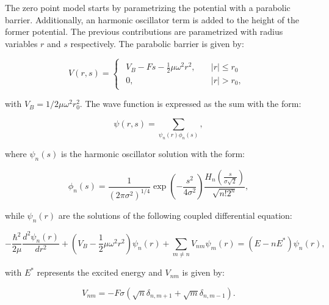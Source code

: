 \documentclass[openany]{book}
\begin{document}
The zero point model starts by parametrizing the potential with a parabolic barrier. Additionally, an harmonic oscillator term is added to the height of the former potential. The previous contributions are parametrized with radius variables $r$ and $s$ respectively. The parabolic barrier is given by: 

\begin{equation}\label{eq:potential_ZPM_parabolic}
		V(r, s) = 	\left\{\begin{array}{l}
		\begin{split}
			V_B - Fs - \frac{1}{2} \mu \omega^2 r^2 , \quad & |r| \le r_0 \\ 
			0, \quad & |r| > r_0,
		\end{split}
	\end{array}\right.
\end{equation}

with $V_B = 1/2\mu\omega^2r_0^2$. The wave function is expressed as the sum with the form: 

\begin{equation}\label{eq:potential_ZPM_waveFunction}
	\psi(r, s) = \sum_{\psi_n(r)\phi_n(s)},
\end{equation}

where $\psi_n(s)$ is the harmonic oscillator solution with the form: 

\begin{equation}\label{eq:potential_ZPM_waveFunction_harmonicOscillator}
	\phi_n(s) = \frac{1}{(2\pi \sigma^2)^{1/4}} \exp {\left(-\frac{s^2}{4\sigma^2}\right)} \frac{H_n\left(\frac{s}{\sigma \sqrt 2 }\right)}{\sqrt{n!2^n}},
\end{equation}

while $\psi_n(r)$ are the solutions of the following coupled differential equation: 

\begin{equation}\label{eq:potential_ZPM_waveFunction_coupledDifferentialEquation}
	 - \frac{\hbar^2}{2\mu} \frac{d^2\psi_n(r)}{dr^2} + \left(V_B - \frac{1}{2} \mu \omega^2 r^2 \right) \psi_n(r) + \sum_{m\neq n}{V_{nm}\psi_m(r)} = (E - nE^{*})\psi_n(r),
\end{equation}

with $E^{*}$ represents the excited energy and $V_{nm}$ is given by: 

\begin{equation}\label{eq:potential_ZPM_potentialCoupled}
	V_{nm} = - F\sigma (\sqrt {n} \delta_{n, m+1} + \sqrt{m}\delta_{n, m-1}). 
\end{equation}
\end{document}
